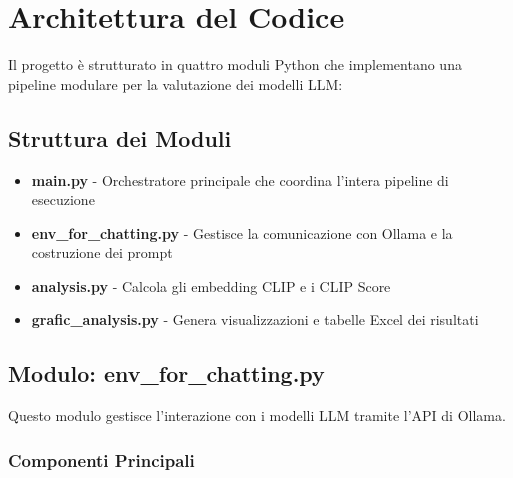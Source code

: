 \documentclass{article}
\begin{document}
\section{Architettura del Codice}

Il progetto è strutturato in quattro moduli Python che implementano una pipeline modulare per la valutazione dei modelli LLM:

\subsection{Struttura dei Moduli}

\begin{itemize}
\item \textbf{main.py} - Orchestratore principale che coordina l'intera pipeline di esecuzione
\item \textbf{env\_for\_chatting.py} - Gestisce la comunicazione con Ollama e la costruzione dei prompt
\item \textbf{analysis.py} - Calcola gli embedding CLIP e i CLIP Score
\item \textbf{grafic\_analysis.py} - Genera visualizzazioni e tabelle Excel dei risultati
\end{itemize}

\subsection{Modulo: env\_for\_chatting.py}

Questo modulo gestisce l'interazione con i modelli LLM tramite l'API di Ollama.

\subsubsection{Componenti Principali}
\end{document}

